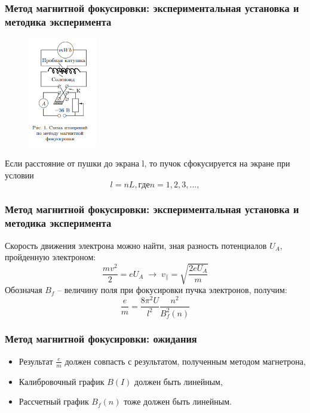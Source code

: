 \documentclass{beamer}
\begin{document}
\begin{frame}
\frametitle{Метод магнитной фокусировки: экспериментальная установка и методика эксперимента}
    \begin{figure}
	\includegraphics[width=3cm]{ris1.PNG}
	\label{ris:ris1}
    \end{figure}
\newline
Если расстояние от пушки до экрана l, то пучок сфокусируется на экране при условии
\begin{equation}
    l = nL, где n = 1, 2, 3, . . . ,
\end{equation}


\end{frame}

\begin{frame}
\frametitle{Метод магнитной фокусировки: экспериментальная установка и методика эксперимента}
Скорость движения электрона можно найти, зная разность потенциалов $U_A$, пройденную электроном:
\begin{equation}
    \frac{mv^2}{2} = eU_A\;\longrightarrow\;v_\parallel = \sqrt{\frac{2eU_A}{m}}
\end{equation}
Обозначая $B_f$ -- величину поля при фокусировки пучка электронов, получим:
\begin{equation}
    \frac{e}{m} = \frac{8 \pi^2 U}{l^2} \frac{n^2}{B_f^2(n)}
\end{equation}
\end{frame}

\begin{frame}
\frametitle{Метод магнитной фокусировки: ожидания}
\begin{itemize}
    \item Результат $\frac{e}{m}$ должен совпасть с результатом, полученным методом магнетрона,
    \item Калибровочный график $B(I)$ должен быть линейным,
    \item Рассчетный график $B_f(n)$ тоже должен быть линейным.
\end{itemize}
\end{frame}
\end{document}
